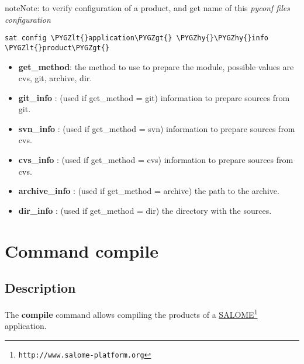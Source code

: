\documentclass[a4paper,10pt,english]{sphinxmanual}
\def\PYGZlt{\char`\<}
\def\PYGZgt{\char`\>}
\def\PYGZhy{\char`\-}
\begin{document}
\begin{notice}{note}{Note:}
to verify configuration of a product, and get name of this \emph{pyconf files configuration}

\begin{Verbatim}[commandchars=\\\{\}]
sat config \PYGZlt{}application\PYGZgt{} \PYGZhy{}\PYGZhy{}info \PYGZlt{}product\PYGZgt{}
\end{Verbatim}
\end{notice}
\begin{itemize}
\item {} 
\textbf{get\_method}: the method to use to prepare the module, possible values are cvs, git, archive, dir.

\item {} 
\textbf{git\_info} : (used if get\_method = git) information to prepare sources from git.

\item {} 
\textbf{svn\_info} : (used if get\_method = svn) information to prepare sources from cvs.

\item {} 
\textbf{cvs\_info} : (used if get\_method = cvs) information to prepare sources from cvs.

\item {} 
\textbf{archive\_info} : (used if get\_method = archive) the path to the archive.

\item {} 
\textbf{dir\_info} : (used if get\_method = dir) the directory with the sources.

\end{itemize}
\clearpage

\section{Command compile}
\label{commands/compile:svn}\label{commands/compile:command-compile}\label{commands/compile::doc}

\subsection{Description}
\label{commands/compile:description}
The \textbf{compile} command allows compiling the products of a \href{http://www.salome-platform.org}{SALOME}\footnote[5]{\sphinxAtStartFootnote%
\nolinkurl{http://www.salome-platform.org}
} application.
\end{document}
